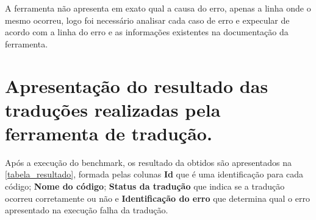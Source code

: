 \par
A ferramenta não apresenta em exato qual a causa do erro, apenas a linha onde o mesmo ocorreu, logo foi necessário analisar cada caso de erro e expecular de acordo com a linha do erro e as informações existentes na documentação da ferramenta.

\section{Apresentação do resultado das traduções realizadas pela ferramenta de tradução.}
\par
Após a execução do benchmark, os resultado da obtidos são apresentados na \autoref{tabela_resultado}, formada pelas colunas \textbf{Id} que é uma identificação para cada código; \textbf{Nome do código}; \textbf{Status da tradução} que indica se a tradução ocorreu corretamente ou não e \textbf{Identificação do erro} que determina qual o erro apresentado na execução falha da tradução.

